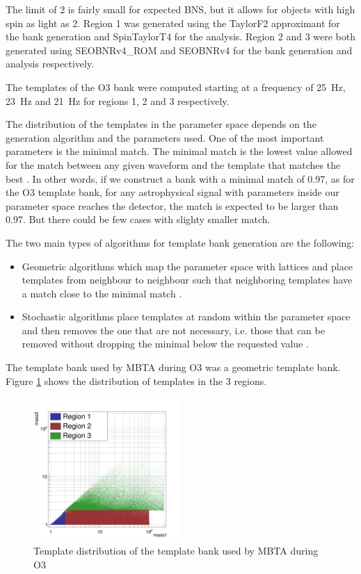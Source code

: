 The limit of \SI{2}{\msun} is fairly small for expected BNS, but it allows for objects with high spin as light as \SI{2}{\msun}.
Region 1 was generated using the TaylorF2 approximant \cite{taylorf2} for the bank generation and SpinTaylorT4 \cite{spintaylort4}  for the analysis.
Region 2 and 3 were both generated using SEOBNRv4\_ROM and SEOBNRv4 \cite{seobnrv4_rom} for the bank generation and analysis respectively.

The templates of the O3 bank were computed starting at a frequency of \SI{25}{Hz}, \SI{23}{Hz} and \SI{21}{Hz} for regions 1, 2 and 3 respectively.

The distribution of the templates in the parameter space depends on the generation algorithm and the parameters used.
One of the most important parameters is the minimal match.
The minimal match is the lowest value allowed for the match between any given waveform and the template that matches the best \cite{Babak_2006}.
In other words, if we construct a bank with a minimal match of 0.97, as for the O3 template bank, for any astrophysical signal with parameters inside our parameter space reaches the detector, the match is expected to be larger than 0.97.
But there could be few cases with slighty smaller match.

The two main types of algorithms for template bank generation are the following:
\begin{itemize}
\item Geometric algorithms which map the parameter space with lattices and place templates from neighbour to neighbour such that neighboring templates have a match close to the minimal match \cite{geometric_bank}.
\item Stochastic algorithms place templates at random within the parameter space and then removes the one that are not necessary, i.e. those that can be removed without dropping the minimal below the requested value \cite{stochastic_bank}.
\end{itemize}
The template bank used by MBTA during O3 was a geometric template bank.
Figure \ref{fig:bankO3} shows the distribution of templates in the 3 regions.
%
\begin{figure}
  \centering
  \includegraphics[width=0.5\textwidth]{cBank.png}
  \caption{Template distribution of the template bank used by MBTA during O3}
  \label{fig:bankO3}
\end{figure}
%



